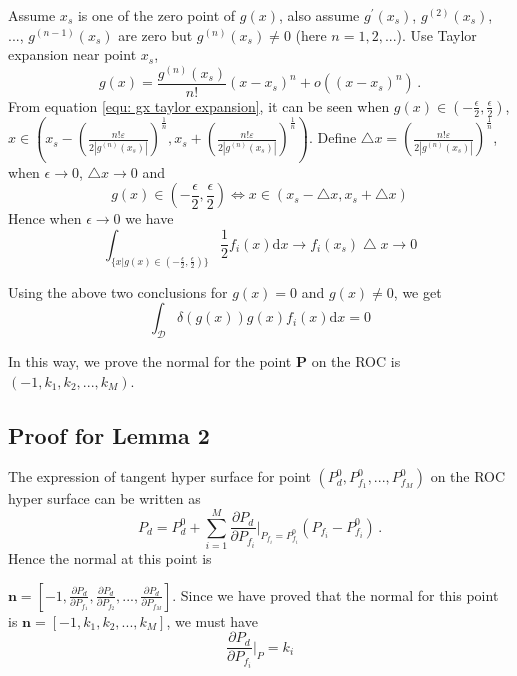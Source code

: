\documentclass[12pt,journal,a4paper,twoside,onecolumn,draft]{IEEEtran}
\begin{document}
\begin{spacing}{2.5}
Assume $x_s$ is one of the zero point of $g(x)$, also assume $g^\prime(x_s)$, $g^{(2)}(x_s)$, ..., $g^{(n-1)}(x_s)$ are zero but $g^{(n)}(x_s) \neq 0$ (here $n = 1, 2, ...$). Use Taylor expansion near point $x_s$,
\begin{equation}
  \label{equ: gx taylor expansion}
  g(x) = \frac{g^{(n)}(x_s)}{n!}(x - x_s)^n + o((x - x_s)^n)\,.
\end{equation}
\def \LEFT{ x_s
  -\left(\frac{n!\varepsilon}{2|g^{(n)}(x_s)|}\right)^{\frac{1}{n}}}
  \def \RIGHT{ x_s
  +\left(\frac{n!\varepsilon}{2|g^{(n)}(x_s)|}\right)^{\frac{1}{n}}}
From equation \eqref{equ: gx taylor expansion}, it can be seen when $g(x)\in (-\frac{\epsilon}{2}, \frac{\epsilon}{2})$, $x \in \left(
      \LEFT, \RIGHT
  \right)$.  Define $\bigtriangleup x = \left(\frac{n!\varepsilon}{2|g^{(n)}(x_s)|}\right)^{\frac{1}{n}}$, when $\epsilon \rightarrow 0$, $\bigtriangleup x \rightarrow 0$ and
\begin{equation}
\label{pro: scale}
g(x) \in (-\frac{\epsilon}{2}, \frac{\epsilon}{2})  \Leftrightarrow x \in (x_s -\bigtriangleup x, x_s + \bigtriangleup x)
\end{equation}
 Hence when $\epsilon \rightarrow 0$ we have
\begin{equation}
\int_{\{x|g(x)\in (-\frac{\epsilon}{2}, \frac{\epsilon}{2})\}} \frac{1}{2}f_i(x) \mathrm{d}x \rightarrow
f_i(x_s)\bigtriangleup x \rightarrow 0
\end{equation}

Using the above two conclusions for $g(x) = 0$ and $g(x) \neq 0$, we get
\begin{equation}
\int_{\mathcal{D}} \delta (g(x)) g(x)f_i(x) \mathrm{d}x = 0
\end{equation}

In this way, we prove the normal for the point \textbf{P} on the ROC is $(-1, k_1, k_2, ..., k_M)$.

\subsection{Proof for Lemma 2}
The expression of tangent hyper surface for point $(P_d^0, P_{f_1}^0, ..., P_{f_M}^0)$ on the ROC hyper surface can be written as
\begin{equation}
P_d = P_d^0 + \sum_{i=1}^{M} \frac{\partial P_d}{\partial P_{f_i}}\bigg|_{P_{f_i} = P_{f_i}^0}(P_{f_i} - P_{f_i}^0)\,.
\end{equation}
Hence the normal at this point is

 $\mathbf{n} = [-1, \frac{\partial P_d}{\partial P_{f_1}}, \frac{\partial P_d}{\partial P_{f_2}}, ..., \frac{\partial P_d}{\partial P_{f_M}}]$. Since we have proved that  the normal for this point is $\mathbf{n} = [-1, k_1, k_2, ..., k_M]$, we must have
\begin{equation}
\frac{\partial P_d}{\partial P_{f_i}}\bigg|_{P} = k_i
\end{equation}



\end{spacing}
\end{document}
